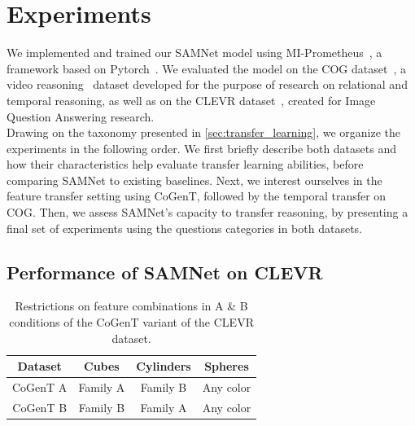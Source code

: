 \section{Experiments}
\label{sec:experiments}

We implemented and trained our SAMNet model using MI-Prometheus~\cite{kornuta2018accelerating}, a framework based on Pytorch~\cite{paszke2017automatic}.
We evaluated the model on the COG dataset~\cite{yang2018dataset}, a video reasoning~\cite{mogadala2019trends} dataset developed for the purpose of research on relational and temporal reasoning, as well as on the CLEVR dataset~\cite{johnson2017clevr}, created for Image Question Answering research.\\
Drawing on the taxonomy presented in \cref{sec:transfer_learning}, we organize the experiments in the following order. We first briefly describe both datasets and how their characteristics help evaluate transfer learning abilities, before comparing SAMNet to existing baselines. Next, we interest ourselves in the feature transfer setting using CoGenT, followed by the temporal transfer on COG. Then, we assess SAMNet's capacity to transfer reasoning, by presenting a final set of experiments using the questions categories in both datasets.

\subsection{Performance of SAMNet on CLEVR}
\label{sec:clevr-baseline-compare}


\begin{table}[ht]
	\centering
		\begin{tabular}{cccc}
			\toprule
			Dataset	& Cubes	& Cylinders &	Spheres	\\
			\midrule
			CoGenT A &  Family A  & Family B 	&	Any color  \\
			CoGenT B	&	Family B  &	Family A	&	Any color \\
			\bottomrule
		\end{tabular}
	\caption{Restrictions on feature combinations in A \& B conditions of the CoGenT variant of the CLEVR dataset.}%
	\label{tab:cogent_conditions}
\end{table}

